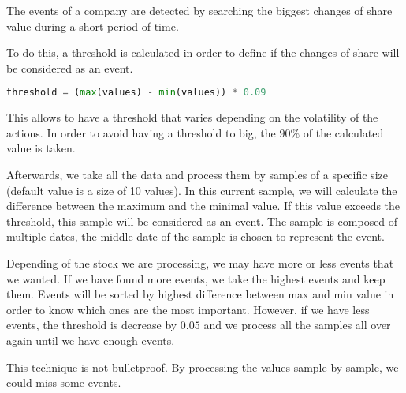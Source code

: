 The events of a company are detected by searching the biggest changes of share value during a short period of time.

To do this, a threshold is calculated in order to define if the changes of share will be considered as an event.

\begin{lstlisting}[language=python, belowskip=-1.0 \baselineskip]
    threshold = (max(values) - min(values)) * 0.09
\end{lstlisting}

This allows to have a threshold that varies depending on the volatility of the actions. In order to avoid having a threshold to big, the $90\%$ of the calculated value is taken.

Afterwards, we take all the data and process them by samples of a specific size (default value is a size of 10 values). In this current sample, we will calculate the difference between the maximum and the minimal value. If this value exceeds the threshold, this sample will be considered as an event. The sample is composed of multiple dates, the middle date of the sample is chosen to represent the event.

Depending of the stock we are processing, we may have more or less events that we wanted. If we have found more events, we take the highest events and keep them. Events will be sorted by highest difference between max and min value in order to know which ones are the most important. However, if we have less events, the threshold is decrease by $0.05$ and we process all the samples all over again until we have enough events.

This technique is not bulletproof. By processing the values sample by sample, we could miss some events.






